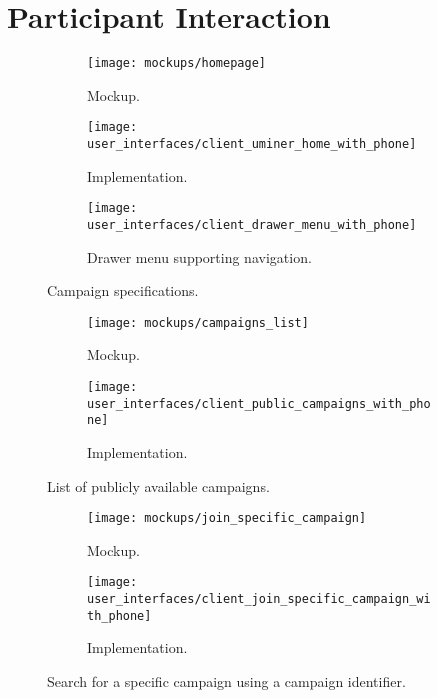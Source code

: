 
\section{Participant Interaction}

\begin{figure}
\begin{subfigure}[!t]{\textwidth}
  \centering
  \texttt{[image: mockups/homepage]}
  \caption{Mockup.}
  \label{fig:mockup_initial_screen}
\end{subfigure}

\begin{subfigure}[!t]{.52\textwidth}
  \centering
  \texttt{[image: user\_interfaces/client\_uminer\_home\_with\_phone]}
  \caption{Implementation.}
  \label{fig:implementation_initial_screen}
\end{subfigure}%
\begin{subfigure}[!t]{.52\textwidth}
  \centering
  \texttt{[image: user\_interfaces/client\_drawer\_menu\_with\_phone]}
  \caption{Drawer menu supporting navigation.}
  \label{fig:drawer_menu}
\end{subfigure}
\caption{Campaign specifications.}
\label{fig:initial_screen}
\end{figure}
\FloatBarrier

\begin{figure}
\begin{subfigure}[!t]{.48\textwidth}
  \centering
  \texttt{[image: mockups/campaigns\_list]}
  \caption{Mockup.}
  \label{fig:mockup_public_campaigns}
\end{subfigure}%
\begin{subfigure}[!t]{.52\textwidth}
  \centering
  \texttt{[image: user\_interfaces/client\_public\_campaigns\_with\_phone]}
  \caption{Implementation.}
  \label{fig:implementation_public_campaigns}
\end{subfigure}
\caption{List of publicly available campaigns.}
\label{fig:public_campaigns}
\end{figure}
\FloatBarrier

\begin{figure}
\begin{subfigure}[!t]{.48\textwidth}
  \centering
  \texttt{[image: mockups/join\_specific\_campaign]}
  \caption{Mockup.}
  \label{fig:mockup_specific_campaign}
\end{subfigure}%
\begin{subfigure}[!t]{.52\textwidth}
  \centering
  \texttt{[image: user\_interfaces/client\_join\_specific\_campaign\_with\_phone]}
  \caption{Implementation.}
  \label{fig:implementation_specific_campaign}
\end{subfigure}
\caption{Search for a specific campaign using a campaign identifier.}
\label{fig:specific_campaign}
\end{figure}
\FloatBarrier

